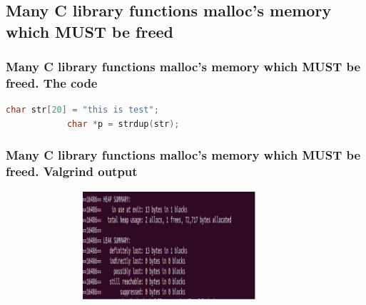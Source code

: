 \documentclass[10pt,xcolor={usenames,dvipsnames}]{beamer}
\begin{document}
\subsection{Many C library functions malloc's memory which MUST be freed}

\begin{frame}[fragile]
\frametitle{Many C library functions malloc's memory which MUST be freed. The code} 
	\begin{center}
		\begin{lstlisting}[language=C++]
			char str[20] = "this is test";
			char *p = strdup(str);
		\end{lstlisting}
	\end{center}
\end{frame}

\begin{frame}[fragile]
	\frametitle{Many C library functions malloc's memory which MUST be freed. Valgrind output}
	\begin{center}
		\begin{figure}
			\includegraphics[height=4cm,width=10cm]{c_funcs_which_allocs_mem.png}
		\end{figure}
	\end{center}
\end{frame}
\end{document}
